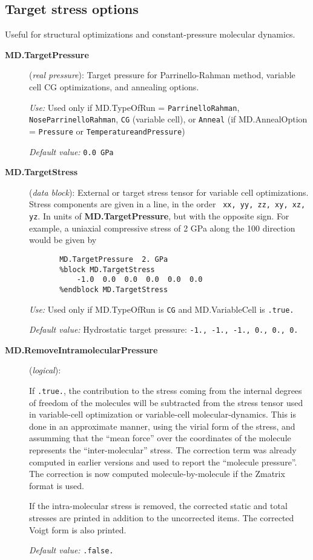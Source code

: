 \documentclass[11pt]{article}
\begin{document}
\subsection{Target stress options}

Useful for structural optimizations and constant-pressure molecular
dynamics.

\begin{description}
 

\item[{\bf MD.TargetPressure}] ({\it real pressure}): 
Target pressure for Parrinello-Rahman method, variable cell CG optimizations,
and annealing options.

{\it Use:} Used only if MD.TypeOfRun = 
{\tt ParrinelloRahman}, {\tt NoseParrinelloRahman},
{\tt CG} (variable cell), or {\tt Anneal} 
(if MD.AnnealOption = {\tt Pressure} or {\tt TemperatureandPressure})

{\it Default value:} {\tt 0.0 GPa}


\item[{\bf MD.TargetStress}] ({\it data block}):
External or target stress tensor for variable cell optimizations.
Stress components are given in a line, in the order {\tt
xx, yy, zz, xy, xz, yz}. In units of {\bf MD.TargetPressure},
but with the opposite sign. For example, a uniaxial compressive stress 
of 2 GPa along the 100 direction would be given by
\begin{verbatim}
       MD.TargetPressure  2. GPa
       %block MD.TargetStress
           -1.0  0.0  0.0  0.0  0.0  0.0
       %endblock MD.TargetStress
\end{verbatim}

{\it Use:} Used only if MD.TypeOfRun is {\tt CG} and 
MD.VariableCell is {\tt .true.} 
 
{\it Default value:} Hydrostatic target pressure: 
{\tt -1., -1., -1., 0., 0., 0.}

\item[{\bf MD.RemoveIntramolecularPressure}] ({\it logical}):
 

If {\tt .true.}, the contribution to the stress coming from the
internal degrees of freedom of the molecules will be subtracted from
the stress tensor used in variable-cell optimization or variable-cell
molecular-dynamics.  This is done in an approximate manner, using the
virial form of the stress, and assumming that the ``mean force'' over
the coordinates of the molecule represents the ``inter-molecular''
stress. The correction term was already computed in earlier versions
and used to report the ``molecule pressure''. The correction is now
computed molecule-by-molecule if the Zmatrix format is used.

If the intra-molecular stress is removed, the corrected static and
total stresses are printed in addition to the uncorrected items.
The corrected Voigt form is also printed.

{\it Default value:} {\tt .false.}
\end{description}
\end{document}
